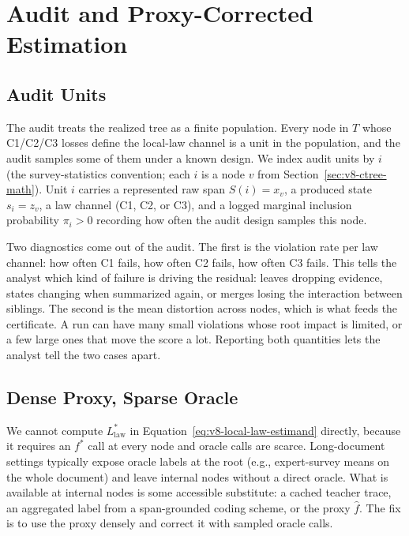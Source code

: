 \section{Audit and Proxy-Corrected Estimation}
\label{sec:v8-audit-certificate}

\subsection{Audit Units}

The audit treats the realized tree as a finite population. Every
node in \(T\) whose C1/C2/C3 losses define the local-law channel is
a unit in the population, and the audit samples some of them under
a known design. We index audit units by \(i\) (the
survey-statistics convention; each \(i\) is a node \(v\) from
Section~\ref{sec:v8-ctree-math}). Unit \(i\) carries a represented
raw span \(S(i)=x_v\), a produced state \(s_i=z_v\), a law channel
(C1, C2, or C3), and a logged marginal inclusion probability
\(\pi_i>0\) recording how often the audit design samples this node.

Two diagnostics come out of the audit. The first is the violation
rate per law channel: how often C1 fails, how often C2 fails, how
often C3 fails. This tells the analyst which kind of failure is
driving the residual: leaves dropping evidence, states changing
when summarized again, or merges losing the interaction between
siblings. The second is the mean distortion across nodes, which is
what feeds the certificate. A run can have many small violations
whose root impact is limited, or a few large ones that move the
score a lot. Reporting both quantities lets the analyst tell the
two cases apart.

\subsection{Dense Proxy, Sparse Oracle}

We cannot compute \(L_{\mathrm{law}}^\ast\) in
Equation~\eqref{eq:v8-local-law-estimand} directly, because it
requires an \(f^\ast\) call at every node and oracle calls are
scarce. Long-document settings typically expose oracle labels at
the root (e.g., expert-survey means on the whole document) and
leave internal nodes without a direct oracle. What is available at
internal nodes is some accessible substitute: a cached teacher
trace, an aggregated label from a span-grounded coding scheme, or
the proxy \(\widehat f\). The fix is to use the proxy densely and
correct it with sampled oracle calls.


